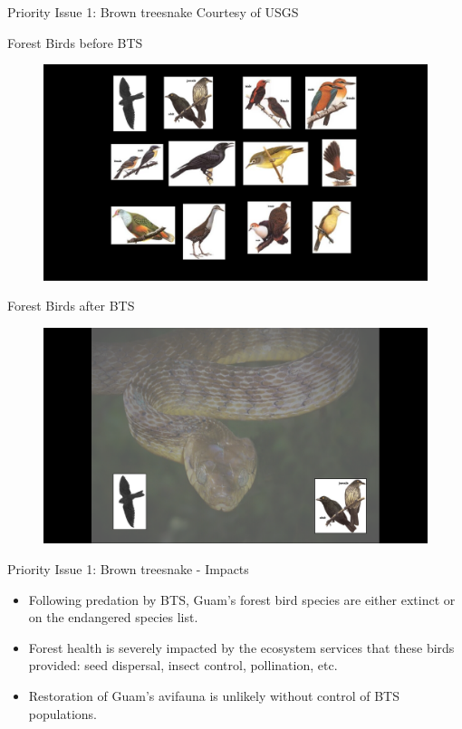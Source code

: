 \documentclass[]{beamer}
\begin{document}
\begin{frame}{Priority Issue 1: Brown treesnake}
	\tiny{Courtesy of USGS}
\end{frame}

\begin{frame}{Forest Birds before BTS}
	\begin{figure}
		\includegraphics[height=0.8\textheight]{images/birds-before-bts.png}
	\end{figure}
\end{frame}

\begin{frame}{Forest Birds after BTS}
	\begin{figure}
		\includegraphics[height=0.8\textheight]{images/birds-after-bts.png}
	\end{figure}
\end{frame}

\begin{frame}{Priority Issue 1: Brown treesnake - Impacts}
	\begin{itemize}
		\item Following predation by BTS, Guam's forest bird species are either extinct or on the endangered species list.
		\item Forest health is severely impacted by the ecosystem services that these birds provided: seed dispersal, insect control, pollination, etc.
		\item Restoration of Guam's avifauna is unlikely without control of BTS populations. 
	\end{itemize}	
\end{frame}
\end{document}
